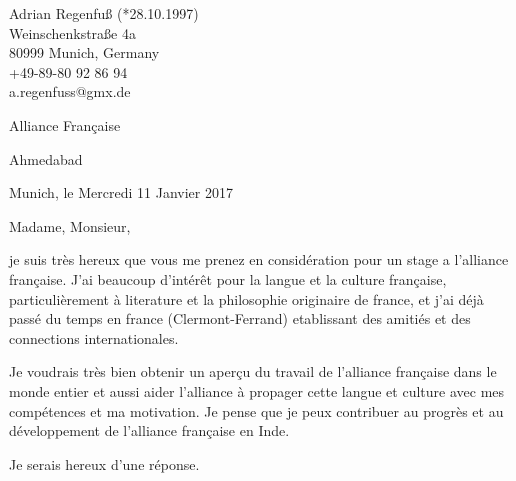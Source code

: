 \documentclass[11pt,a4paper]{article}
\begin{document}
\thispagestyle{empty}
\pagestyle{empty}

{\raggedright{}
Adrian Regenfuß (*28.10.1997)\\
Weinschenkstraße 4a\\
80999 Munich, Germany\\
+49-89-80 92 86 94\\
a.regenfuss@gmx.de\\}

\vspace{20pt}

{\bf\centerline{{\huge Alliance Française}}}

\vspace{5pt}

{\centerline{{\huge Ahmedabad}}}

\vspace{20pt}

{\centerline{Munich, le Mercredi 11 Janvier 2017}}

\vspace{10pt}

Madame, Monsieur,

je suis très hereux que vous me prenez en considération pour un stage
a l'alliance française. J'ai beaucoup d'intérêt pour la langue et la
culture française, particulièrement à literature et la philosophie
originaire de france, et j'ai déjà passé du temps en france (Clermont-Ferrand)
etablissant des amitiés et des connections internationales.

Je voudrais très bien obtenir un aperçu du travail de l'alliance française
dans le monde entier et aussi aider l'alliance à propager cette langue
et culture avec mes compétences et ma motivation. Je pense que je peux
contribuer au progrès et au développement de l'alliance française en
Inde.

Je serais hereux d'une réponse.

\vspace{40pt}
\end{document}

